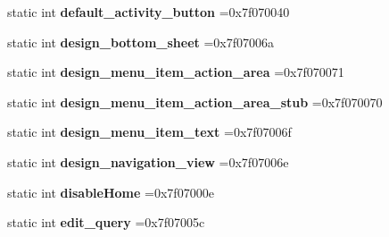 \begin{DoxyCompactItemize}
\mbox{\label{classandroid_1_1support_1_1design_1_1R_1_1id_a72b6f9d8af295b630c11ed4000613bdd}} 
static int {\bfseries default\+\_\+activity\+\_\+button} =0x7f070040
\item 
\mbox{\label{classandroid_1_1support_1_1design_1_1R_1_1id_a2967e58cc82a23afd6822bccface2028}} 
static int {\bfseries design\+\_\+bottom\+\_\+sheet} =0x7f07006a
\item 
\mbox{\label{classandroid_1_1support_1_1design_1_1R_1_1id_adb1f6dcc6bc1b6f8242513677fd2adfb}} 
static int {\bfseries design\+\_\+menu\+\_\+item\+\_\+action\+\_\+area} =0x7f070071
\item 
\mbox{\label{classandroid_1_1support_1_1design_1_1R_1_1id_aa3d4abbf1efabedaa584753a34d4ed1f}} 
static int {\bfseries design\+\_\+menu\+\_\+item\+\_\+action\+\_\+area\+\_\+stub} =0x7f070070
\item 
\mbox{\label{classandroid_1_1support_1_1design_1_1R_1_1id_a24881f45703ceeb5111ede250fca64b4}} 
static int {\bfseries design\+\_\+menu\+\_\+item\+\_\+text} =0x7f07006f
\item 
\mbox{\label{classandroid_1_1support_1_1design_1_1R_1_1id_a0b5e3f30257e1c0f45d2c9403124c2e7}} 
static int {\bfseries design\+\_\+navigation\+\_\+view} =0x7f07006e
\item 
\mbox{\label{classandroid_1_1support_1_1design_1_1R_1_1id_ae8ff3fe92c300ab2767075c199db3cec}} 
static int {\bfseries disable\+Home} =0x7f07000e
\item 
\mbox{\label{classandroid_1_1support_1_1design_1_1R_1_1id_a963c0b3595be2789b50754ab68fc2f5e}} 
static int {\bfseries edit\+\_\+query} =0x7f07005c
\item 
\mbox{\label{classandroid_1_1support_1_1design_1_1R_1_1id_a927e317f19d396cc429ed98c2878b22d}} 

\end{DoxyCompactItemize}
